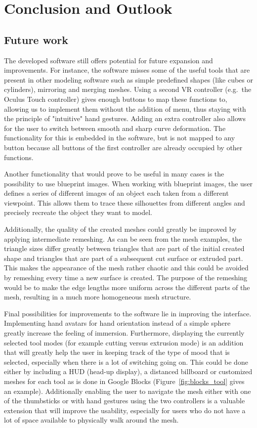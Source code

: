 \chapter{Conclusion and Outlook}
\label{chap:conclusion}

\section{Future work}
The developed software still offers potential for future expansion and improvements. For instance, the software misses some of the useful tools that are present in other modeling software such as simple predefined shapes (like cubes or cylinders), mirroring and merging meshes. Using a second VR controller (e.g.\ the Oculus Touch controller) gives enough buttons to map these functions to, allowing us to implement them without the addition of menu, thus staying with the principle of "intuitive" hand gestures. Adding an extra controller also allows for the user to switch between smooth and sharp curve deformation. The functionality for this is embedded in the software, but is not mapped to any button because all buttons of the first controller are already occupied by other functions. 

Another functionality that would prove to be useful in many cases is the possibility to use blueprint images. When working with blueprint images, the user defines a series of different images of an object each taken from a different viewpoint. This allows them to trace these silhouettes from different angles and precisely recreate the object they want to model.

Additionally, the quality of the created meshes could greatly be improved by applying intermediate remeshing. As can be seen from the mesh examples, the triangle sizes differ greatly between triangles that are part of the initial created shape and triangles that are part of a subsequent cut surface or extruded part. This makes the appearance of the mesh rather chaotic and this could be avoided by remeshing every time a new surface is created. The purpose of the remeshing would be to make the edge lengths more uniform across the different parts of the mesh, resulting in a much more homogeneous mesh structure.

Final possibilities for improvements to the software lie in improving the interface. Implementing hand avatars for hand orientation instead of a simple sphere greatly increase the feeling of immersion. Furthermore, displaying the currently selected tool modes (for example cutting versus extrusion mode) is an addition that will greatly help the user in keeping track of the type of mood that is selected, especially when there is a lot of switching going on. This could be done either by including a HUD (head-up display), a distanced billboard or customized meshes for each tool as is done in Google Blocks (Figure~\ref{fig:blocks_tool} gives an example). Additionally enabling the user to navigate the mesh either with one of the thumbsticks or with hand gestures using the two controllers is a valuable extension that will improve the usability, especially for users who do not have a lot of space available to physically walk around the mesh. 

